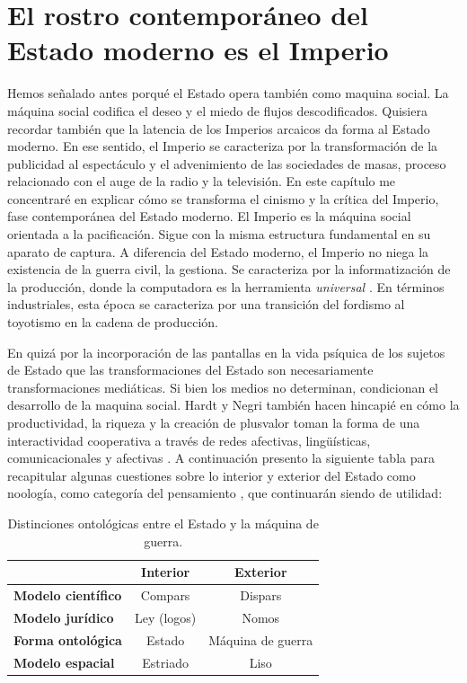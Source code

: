 \chapter{El rostro contemporáneo del Estado moderno es el Imperio}
\label{cha:el-rostro}

Hemos señalado antes porqué el Estado opera también como maquina social. La máquina social codifica el deseo y el miedo de flujos descodificados. Quisiera recordar también que la latencia de los Imperios arcaicos da forma al Estado moderno. En ese sentido, el Imperio se caracteriza por la transformación de la publicidad al espectáculo y el advenimiento de las sociedades de masas, proceso relacionado con el auge de la radio y la televisión. En este capítulo me concentraré en explicar cómo se transforma el cinismo y la crítica del Imperio, fase contemporánea del Estado moderno. El Imperio es la máquina social orientada a la pacificación. Sigue con la misma estructura fundamental en su aparato de captura. A diferencia del Estado moderno, el Imperio no niega la existencia de la guerra civil, la gestiona. Se caracteriza por la informatización de la producción, donde la computadora es la herramienta \emph{universal} \autocite{hardtImperio2005} . En términos industriales, esta época se caracteriza por una transición del fordismo al toyotismo en la cadena de producción.

En quizá por la incorporación de las pantallas en la vida psíquica de los sujetos de Estado que las transformaciones del Estado son necesariamente transformaciones mediáticas. Si bien los medios no determinan, condicionan el desarrollo de la maquina social. Hardt y Negri también hacen hincapié en cómo la productividad, la riqueza y la creación de plusvalor toman la forma de una interactividad cooperativa a través de redes afectivas, lingüísticas, comunicacionales y afectivas \autocite[pp.~58,108]{hardtImperio2005}. A continuación presento la siguiente tabla para recapitular algunas cuestiones sobre lo interior y exterior del Estado como noología, como categoría del pensamiento \autocite{deleuzeMilMesetasCapitalismo2002}, que continuarán siendo de utilidad:

\begin{table}[htb]
  \caption{Distinciones ontológicas entre el Estado y la máquina de guerra.} %
  \label{tab:tablename}
  \centering
  \begin{tabular}{lcc}
    \toprule
    & \textbf{Interior} & \textbf{Exterior}\\
    \midrule
    \textbf{Modelo científico} & Compars & Dispars\\
    \textbf{Modelo jurídico} & Ley (logos) & Nomos\\
    \textbf{Forma ontológica} & Estado & Máquina de guerra\\
    \textbf{Modelo espacial} & Estriado & Liso\\
    \bottomrule
  \end{tabular}
\end{table}


